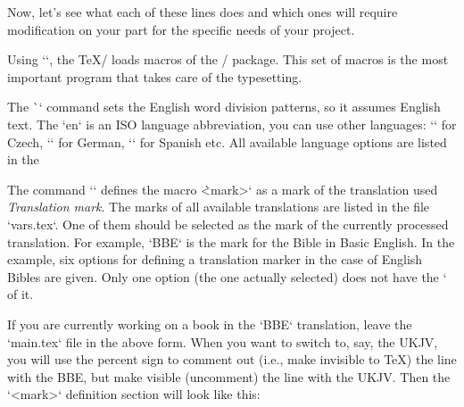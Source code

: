 \def\printedbooks {%
 Gen Exod Lev Num Deut Josh Judg Ruth 1Sam 2Sam 1Kgs 2Kgs 1Chr 2Chr Ezra Neh Esth Job Ps 
 Prov Eccl Song Isa Jer Lam Ezek Dan Hos Joel Amos Obad Jonah Mic Nah Hab Zeph Hag Zech Mal    
 Matt Mark Luke John Acts Rom 1Cor 2Cor Gal Eph Phil Col 1Thess 2Thess 1Tim 2Tim Titus  
 Phlm Heb Jas 1Pet 2Pet 1John 2John 3John Jude Rev
}

\processbooks %
\bye
\endtt

Now, let's see what each of these lines does and which ones will require modification on your part 
for the specific needs of your project.

Using `\load[opbible]`,  the \TeX/ loads macros of the \OpBible/ package. 
This set of macros is the most important program that takes care of the 
typesetting.

The \`\enlang` command sets the English word division patterns, so it assumes English
text. The `en` is an ISO language abbreviation, you can use other languages:
`\cslang` for Czech, `\delang` for German, `\eslang` for Spanish
etc. All available language options are listed in the 

The command `\def\tmark {<mark>}` defines the macro \`\tmark` as a mark
of the translation used {\em Translation mark}. The marks of all available translations are listed 
in the file `vars.tex`. 
One of them should be selected as the mark of the currently processed
translation. For example, `BBE` is the mark for the Bible in Basic English.
In the example, six options for defining a translation marker in the case of English Bibles are 
given. Only one option (the one actually selected) does not have the `%
of it. 

 
If you are currently working on a book  in the `BBE` translation, leave the `main.tex` file in the 
above form.
When you want to switch to, say, the UKJV, you will use the percent sign to comment out (i.e., make 
invisible to \TeX) the line with the BBE, but make visible (uncomment)
the line with the UKJV. Then the `\tmark` definition section will look like this:

\begtt
\def\tmark {UKJV}    %
\endtt

